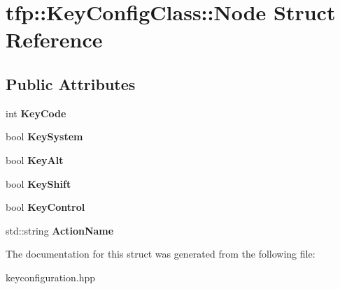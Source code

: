 \hypertarget{structtfp_1_1_key_config_class_1_1_node}{}\section{tfp\+:\+:Key\+Config\+Class\+:\+:Node Struct Reference}
\label{structtfp_1_1_key_config_class_1_1_node}
\subsection*{Public Attributes}
\begin{DoxyCompactItemize}
\item 
\mbox{\label{structtfp_1_1_key_config_class_1_1_node_a89020ad9ac07b45e05881f1ad9a3f201}} 
int {\bfseries Key\+Code}
\item 
\mbox{\label{structtfp_1_1_key_config_class_1_1_node_a406df5e518bf88d13eedb59649ec0033}} 
bool {\bfseries Key\+System}
\item 
\mbox{\label{structtfp_1_1_key_config_class_1_1_node_ab308cf66de9abc55470f3251536d168d}} 
bool {\bfseries Key\+Alt}
\item 
\mbox{\label{structtfp_1_1_key_config_class_1_1_node_aad0c0984be5056abdb858117f105f2c2}} 
bool {\bfseries Key\+Shift}
\item 
\mbox{\label{structtfp_1_1_key_config_class_1_1_node_a67945af4ed76fb1869626dce57aff18e}} 
bool {\bfseries Key\+Control}
\item 
\mbox{\label{structtfp_1_1_key_config_class_1_1_node_ae88d85e7a8d86148bd9454131219768a}} 
std\+::string {\bfseries Action\+Name}
\end{DoxyCompactItemize}


The documentation for this struct was generated from the following file\+:\begin{DoxyCompactItemize}
\item 
keyconfiguration.\+hpp\end{DoxyCompactItemize}
